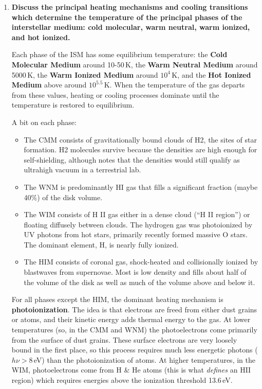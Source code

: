 \documentclass[12pt, letterpaper, preprint]{aastex}
\begin{document}
\begin{enumerate}

\item \textbf{Discuss the principal heating mechanisms and cooling transitions which determine the temperature of the principal phases of the interstellar medium: cold molecular, warm neutral, warm ionized, and hot ionized.}

Each phase of the ISM has some equilibrium temperature: the \textbf{Cold Molecular Medium} around 10-50\,K, the \textbf{Warm Neutral Medium} around 5000\,K, the \textbf{Warm Ionized Medium} around $10^4$\,K, and the \textbf{Hot Ionized Medium} above around $10^{5.5}$\,K. When the temperature of the gas departs from these values, heating or cooling processes dominate until the temperature is restored to equilibrium.

A bit on each phase:
\begin{itemize}
\item The CMM consists of gravitationally bound clouds of H2, the sites of star formation. H2 molecules survive because the densities are high enough for self-shielding, although notes that the densities would still qualify as ultrahigh vacuum in a terrestrial lab. 
\item The WNM is predominantly HI gas that fills a significant fraction (maybe 40\%) of the disk volume.
\item The WIM consists of H II gas either in a dense cloud (``H II region'') or floating diffusely between clouds. The hydrogen gas was photoionized by UV photons from hot stars, primarily recently formed massive O stars. The dominant element, H, is nearly fully ionized. 
\item The HIM consists of coronal gas, shock-heated and collisionally ionized by blastwaves from supernovae. Most is low density and fills about half of the volume of the disk as well as much of the volume above and below it.
\end{itemize}

For all phases except the HIM, the dominant heating mechanism is \textbf{photoionization}. The idea is that electrons are freed from either dust grains or atoms, and their kinetic energy adds thermal energy to the gas. At lower temperatures (so, in the CMM and WNM) the photoelectrons come primarily from the surface of dust grains. These surface electrons are very loosely bound in the first place, so this process requires much less energetic photons ($h\nu > 8$\,eV) than the photoionization of atoms. At higher temperatures, in the WIM, photoelectrons come from H \& He atoms (this is what \emph{defines} an HII region) which requires energies above the ionization threshold 13.6\,eV. 


\end{enumerate}
\end{document}
